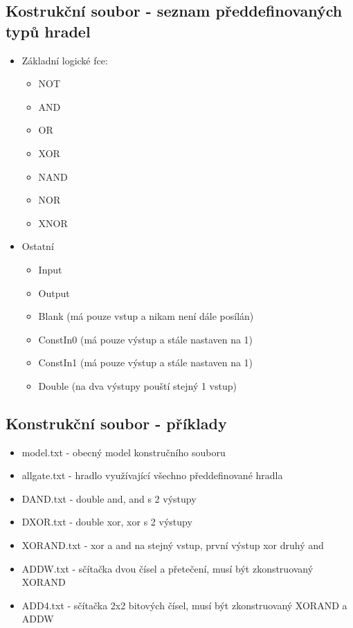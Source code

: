 \documentclass[12pt, oneside]{article}
\begin{document}
\subsection*{Kostrukční soubor - seznam předdefinovaných typů hradel}
\begin{itemize}
\item Základní logické fce: 
\begin{itemize}
\item NOT
\item AND
\item OR
\item XOR
\item NAND
\item NOR
\item XNOR
\end{itemize}
\newpage
\item Ostatní 
\begin{itemize}
\item Input
\item Output
\item Blank (má pouze vstup a nikam není dále posílán) 
\item ConstIn0 (má pouze výstup a stále nastaven na 1)
\item ConstIn1 (má pouze výstup a stále nastaven na 1) 
\item Double (na dva výstupy pouští stejný 1 vstup) 
\end{itemize}
\end{itemize}
\subsection*{Konstrukční soubor - příklady} 
\begin{itemize}
\item model.txt - obecný model konstručního souboru
\item allgate.txt - hradlo využívající všechno předdefinované hradla
\item DAND.txt - double and, and s 2 výstupy
\item DXOR.txt - double xor, xor s 2 výstupy
\item XORAND.txt - xor a and na stejný vstup, první výstup xor druhý and
\item ADDW.txt - sčítačka dvou čísel a přetečení, musí být zkonstruovaný XORAND
\item ADD4.txt - sčítačka 2x2 bitových čísel, musí být zkonstruovaný XORAND a ADDW
\end{itemize}
\newpage
\end{document}
